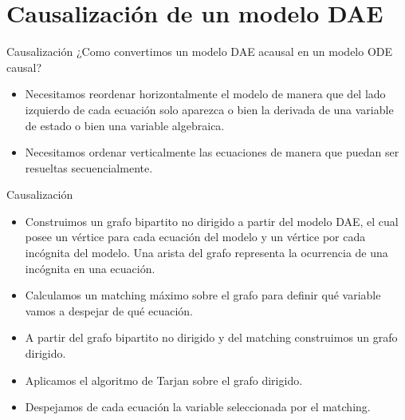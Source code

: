 \section{Causalización de un modelo DAE}

\begin{frame}{Causalización}
    ¿Como convertimos un modelo DAE acausal en un modelo ODE causal?
    \pause
    \begin{itemize}
        \item<2-> Necesitamos reordenar horizontalmente el modelo de manera que del lado izquierdo de cada ecuación solo aparezca o bien la derivada de una variable de estado o bien una variable algebraica.
        \item<3-> Necesitamos ordenar verticalmente las ecuaciones de manera que puedan ser resueltas secuencialmente.
    \end{itemize}
\end{frame}

\begin{frame}{Causalización}
    \begin{itemize}
        \item<1-> Construimos un grafo bipartito no dirigido a partir del modelo DAE, el cual posee un vértice para cada ecuación del modelo y un vértice por cada incógnita del modelo. Una arista del grafo representa la ocurrencia de una incógnita en una ecuación.
        \item<2-> Calculamos un matching máximo sobre el grafo para definir qué variable vamos a despejar de qué ecuación.
        \item<3-> A partir del grafo bipartito no dirigido y del matching construimos un grafo dirigido.
        \item<4-> Aplicamos el algoritmo de Tarjan sobre el grafo dirigido.
        \item<5-> Despejamos de cada ecuación la variable seleccionada por el matching.
    \end{itemize}
\end{frame}

